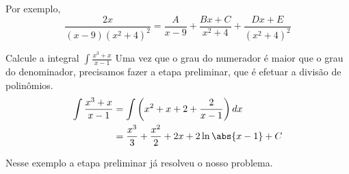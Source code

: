 Por exemplo,
\[
  \frac{2x}{(x-9)(x^2+4)^2}
  = \frac{A}{x-9}
  + \frac{Bx+C}{x^2+4}
  + \frac{Dx+E}{(x^2+4)^2}
\]

\begin{example}
  Calcule a integral \(\int \frac{x^3+x}{x-1}\)
  \solution
  Uma vez que o grau do numerador é maior que o grau do denominador, precisamos
  fazer a etapa preliminar, que é efetuar a divisão de polinômios.
  \begin{align*}
    \int \frac{x^3+x}{x-1}
    & = \int \left( x^2+x+2 + \frac{2}{x-1} \right) dx \\
    & = \frac{x^3}{3}
      + \frac{x^2}{2}
      + 2x
      + 2 \ln\abs{x-1}
      + C
  \end{align*}
\end{example}

Nesse exemplo a etapa preliminar já resolveu o nosso problema.

